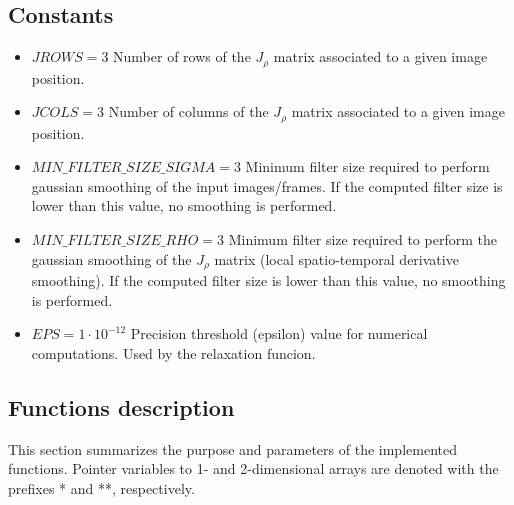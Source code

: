 \documentclass{article}
\begin{document}
\subsection{Constants}
\begin{itemize}
 \item $JROWS = 3$ Number of rows of the $J_\rho$ matrix associated to a given 
       image position.
 \item $JCOLS = 3$ Number of columns of the $J_\rho$ matrix associated to a given 
       image position.
 \item $MIN\_FILTER\_SIZE\_SIGMA = 3$ Minimum filter size required to perform 
       gaussian smoothing of the input images/frames. If the computed filter size 
       is lower than this value, no smoothing is performed.
 \item $MIN\_FILTER\_SIZE\_RHO = 3$ Minimum filter size required to perform the 
       gaussian smoothing of the $J_\rho$ matrix (local spatio-temporal derivative 
       smoothing). If the computed filter size is lower than this value, no 
       smoothing is performed.
 \item $EPS = 1\cdot10^{-12}$ Precision threshold (epsilon) value for numerical computations. 
       Used by the relaxation funcion.
\end{itemize}


\subsection{Functions description}

This section summarizes the purpose and parameters of the implemented functions. 
Pointer variables to 1- and 2-dimensional arrays are denoted with the prefixes 
* and **, respectively.
\end{document}
